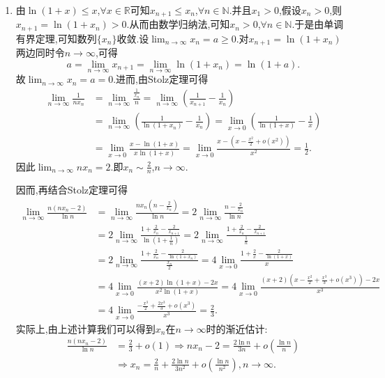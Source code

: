 \documentclass[../../main.tex]{subfiles}%
\begin{document}
\begin{solution}
\begin{enumerate}
\item 由\(\ln(1 + x) \leqslant  x\),\(\forall x\in\mathbb{R}\)可知\(x_{n + 1} \leqslant  x_n\),\(\forall n\in\mathbb{N}\).并且\(x_1 > 0\),假设\(x_n > 0\),则\(x_{n + 1} = \ln(1 + x_n) > 0\).从而由数学归纳法,可知\(x_n > 0\),\(\forall n\in\mathbb{N}\).于是由单调有界定理,可知数列\(\{x_n\}\)收敛.设\(\lim_{n\rightarrow\infty}x_n = a\geqslant 0\).对\(x_{n + 1} = \ln(1 + x_n)\)两边同时令\(n\rightarrow\infty\),可得
\[
a = \lim_{n\rightarrow\infty}x_{n + 1} = \lim_{n\rightarrow\infty}\ln(1 + x_n) = \ln(1 + a).
\]
故\(\lim_{n\rightarrow\infty}x_n = a = 0\).进而,由Stolz定理可得
\begin{align*}
\lim_{n\rightarrow\infty}\frac{1}{nx_n}&=\lim_{n\rightarrow\infty}\frac{\frac{1}{x_n}}{n}=\lim_{n\rightarrow\infty}\left(\frac{1}{x_{n + 1}} - \frac{1}{x_n}\right)\\
&=\lim_{n\rightarrow\infty}\left(\frac{1}{\ln(1 + x_n)} - \frac{1}{x_n}\right)=\lim_{x\rightarrow0}\left(\frac{1}{\ln(1 + x)} - \frac{1}{x}\right)\\
&=\lim_{x\rightarrow0}\frac{x - \ln(1 + x)}{x\ln(1 + x)}=\lim_{x\rightarrow0}\frac{x - \left(x - \frac{x^2}{2} + o(x^2)\right)}{x^2}=\frac{1}{2}.
\end{align*}
因此\(\lim_{n\rightarrow\infty}nx_n = 2\).即\(x_n\sim\frac{2}{n}\),\(n\rightarrow\infty\).

因而,再结合Stolz定理可得
\begin{align*}
\lim_{n\rightarrow\infty}\frac{n(nx_n - 2)}{\ln n}&=\lim_{n\rightarrow\infty}\frac{nx_n\left(n - \frac{2}{x_n}\right)}{\ln n}=2\lim_{n\rightarrow\infty}\frac{n - \frac{2}{x_n}}{\ln n}\\
&=2\lim_{n\rightarrow\infty}\frac{1 + \frac{2}{x_n} - \frac{2}{x_{n + 1}}}{\ln\left(1 + \frac{1}{n}\right)}=2\lim_{n\rightarrow\infty}\frac{1 + \frac{2}{x_n} - \frac{2}{x_{n + 1}}}{\frac{1}{n}}\\
&=2\lim_{n\rightarrow\infty}\frac{1 + \frac{2}{x_n} - \frac{2}{\ln(1 + x_n)}}{\frac{x_n}{2}}=4\lim_{x\rightarrow0}\frac{1 + \frac{2}{x} - \frac{2}{\ln(1 + x)}}{x}\\
&=4\lim_{x\rightarrow0}\frac{(x + 2)\ln(1 + x) - 2x}{x^2\ln(1 + x)}=4\lim_{x\rightarrow0}\frac{(x + 2)\left(x - \frac{x^2}{2} + \frac{x^3}{3} + o(x^3)\right) - 2x}{x^3}\\
&=4\lim_{x\rightarrow0}\frac{-\frac{x^3}{2} + \frac{2x^3}{3} + o(x^3)}{x^3}=\frac{2}{3}.
\end{align*}
实际上,由上述计算我们可以得到\(x_n\)在\(n\rightarrow\infty\)时的渐近估计:
\begin{align*}
\frac{n(nx_n - 2)}{\ln n}&=\frac{2}{3} + o(1)\Rightarrow nx_n - 2=\frac{2\ln n}{3n} + o\left(\frac{\ln n}{n}\right)\\
&\Rightarrow x_n=\frac{2}{n} + \frac{2\ln n}{3n^2} + o\left(\frac{\ln n}{n^2}\right),n\rightarrow\infty.
\end{align*}


\end{enumerate}
\end{solution}
\end{document}
